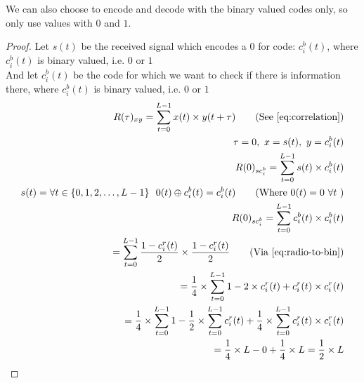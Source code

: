 		We can also choose to encode and decode with the binary valued codes only, so only use values with $0$ and $1$. 


		\begin{proof}
			Let $s(t)$ be the received signal which encodes a 0 for code: $c^b_i(t)$, where $c^b_i(t)$ is binary valued, i.e. $0$ or $1$ \\
			And let $c^b_i(t)$ be the code for which we want to check if there is information there, where $c^b_i(t)$ is binary valued, i.e. $0$ or $1$ \\

			\begin{align*}
				R(\tau)_{xy} = \displaystyle\sum_{t = 0} ^ {L - 1} x(t) \times y(t + \tau)	\tag{See \autoref{eq:correlation}}
				\\ \tau = 0,\ x = s(t),\ y = c^b_i(t)	
				\\ R(0)_{sc^b_{i}} = \displaystyle\sum_{t = 0} ^ {L - 1} s(t) \times c^b_i(t)	
				\\ s(t) = \forall t \in \{ 0, 1, 2, \dotsc, L - 1 \} \ \ 0(t) \oplus c^b_i(t) = c^b_i(t) \tag{Where $0(t) = 0 \ \forall t$ }
				\\ R(0)_{sc^b_{i}} = \displaystyle\sum_{t = 0} ^ {L - 1} c^b_i(t) \times c^b_i(t)
				\\ = \displaystyle\sum_{t = 0} ^ {L - 1} \frac{1 - c^r_i(t)}{2} \times \frac{1 - c^r_i(t)}{2} \tag{Via \autoref{eq:radio-to-bin}}
				\\ = \frac{1}{4} \times \displaystyle\sum_{t = 0} ^ {L - 1} 1 - 2 \times c^r_i(t) + c^r_i(t) \times c^r_i(t)
				\\ = \frac{1}{4} \times \displaystyle\sum_{t = 0} ^ {L - 1} 1 - \frac{1}{2} \times \displaystyle\sum_{t = 0} ^ {L - 1} c^r_i(t) + \frac{1}{4} \times \displaystyle\sum_{t = 0} ^ {L - 1} c^r_i(t) \times c^r_i(t)
				\\ = \frac{1}{4} \times L - 0 + \frac{1}{4} \times L = \frac{1}{2} \times L
			\end{align*}

		\end{proof}


